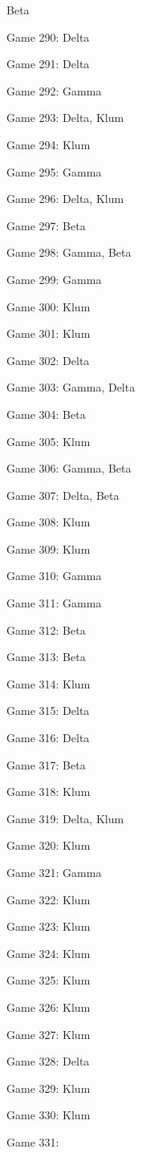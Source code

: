 \documentclass{article}
\begin{document}
\begin{multicols}{3}
\begin{compactitem}
Beta
\item Game 290:
Delta
\item Game 291:
Delta
\item Game 292:
Gamma
\item Game 293:
Delta, Klum
\item Game 294:
Klum
\item Game 295:
Gamma
\item Game 296:
Delta, Klum
\item Game 297:
Beta
\item Game 298:
Gamma, Beta
\item Game 299:
Gamma
\item Game 300:
Klum
\item Game 301:
Klum
\item Game 302:
Delta
\item Game 303:
Gamma, Delta
\item Game 304:
Beta
\item Game 305:
Klum
\item Game 306:
Gamma, Beta
\item Game 307:
Delta, Beta
\item Game 308:
Klum
\item Game 309:
Klum
\item Game 310:
Gamma
\item Game 311:
Gamma
\item Game 312:
Beta
\item Game 313:
Beta
\item Game 314:
Klum
\item Game 315:
Delta
\item Game 316:
Delta
\item Game 317:
Beta
\item Game 318:
Klum
\item Game 319:
Delta, Klum
\item Game 320:
Klum
\item Game 321:
Gamma
\item Game 322:
Klum
\item Game 323:
Klum
\item Game 324:
Klum
\item Game 325:
Klum
\item Game 326:
Klum
\item Game 327:
Klum
\item Game 328:
Delta
\item Game 329:
Klum
\item Game 330:
Klum
\item Game 331:

\end{compactitem}
\end{multicols}
\end{document}
